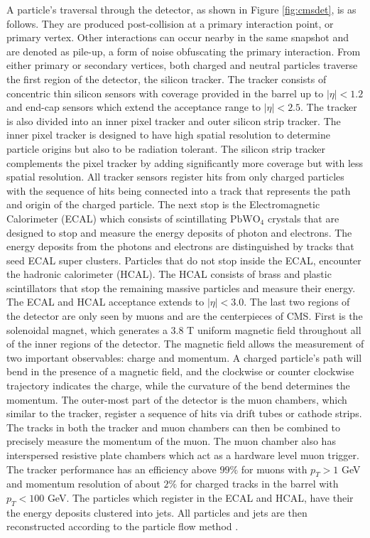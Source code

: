 A particle's traversal through the detector, as shown in Figure \ref{fig:cmsdet}, is as follows. They are produced post-collision at a primary interaction point, or primary vertex. Other interactions can occur nearby in the same snapshot and are denoted as pile-up, a form of noise obfuscating the primary interaction. From either primary or secondary vertices, both charged and neutral particles traverse the first region of the detector, the silicon tracker. The tracker consists of concentric thin silicon sensors with coverage provided in the barrel up to $|\eta|<1.2$ and end-cap sensors which extend the acceptance range to $|\eta| < 2.5$. The tracker is also divided into an inner pixel tracker and outer silicon strip tracker. The inner pixel tracker is designed to have high spatial resolution to determine particle origins but also to be radiation tolerant. The silicon strip tracker complements the pixel tracker by adding significantly more coverage but with less spatial resolution. All tracker sensors  register hits from only charged particles with the sequence of hits being connected into a track that represents the path and origin of the charged particle.  The next stop is the Electromagnetic Calorimeter (ECAL) which consists of scintillating $\text{PbWO}_4$ crystals that are designed to stop and measure the energy deposits of photon and electrons. The energy deposits from the photons and electrons are distinguished by tracks that seed ECAL super clusters. Particles that do not stop inside the ECAL, encounter the hadronic calorimeter (HCAL). The HCAL consists of brass and plastic scintillators that stop the remaining massive particles and measure their energy. The ECAL and HCAL acceptance extends to $|\eta| <3.0$. The last two regions of the detector are only seen by muons and are the centerpieces of CMS. First is the solenoidal magnet, which generates a 3.8 T uniform magnetic field throughout all of the inner regions of the detector. The magnetic field allows the measurement of two important observables: charge and momentum.  A charged particle's path will bend in the presence of a magnetic field, and the clockwise or counter clockwise trajectory indicates the charge, while the curvature of the bend determines the momentum. The outer-most part of the detector is the muon chambers, which similar to the tracker, register a sequence of hits via drift tubes or cathode strips. The tracks in both the tracker and muon chambers can then be combined to precisely measure the momentum of the muon. The muon chamber also has interspersed resistive plate chambers which act as a hardware level muon trigger. The tracker performance has an efficiency above $99\%$ for muons with $p_T > 1$ GeV and momentum resolution of about $2\%$ for charged tracks in the barrel with $p_T < 100$ GeV. The particles which register in the ECAL and HCAL, have their the energy deposits clustered into jets. All particles and jets are then reconstructed according to the particle flow method \cite{CMS:2017yfk} \cite{CMS:2008xjf} \cite{CMS:2017lum}.

